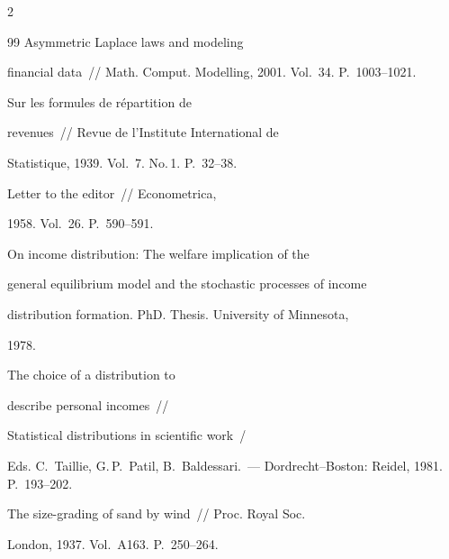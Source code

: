 \begin{multicols}{2}
{{\begin{thebibliography}{99}
Asymmetric Laplace laws and modeling


financial data~// Math. Comput. Modelling, 2001. Vol.~34. P.~1003--1021.









Sur les formules de r{\'e}partition de


revenues~// Revue de l'Institute International de


Statistique, 1939. Vol.~7. No.\,1. P.~32--38.









Letter to the editor~// Econometrica,


1958. Vol.~26. P.~590--591.









On income distribution: The welfare implication of the


general equilibrium model and the stochastic processes of income


distribution formation. PhD. Thesis. University of Minnesota,


1978.









The choice of a distribution to


describe personal incomes~//


Statistical distributions in scientific work~/


Eds. C.~Taillie, G.\,P.~Patil, B.~Baldessari.~---  Dordrecht--Boston: Reidel, 1981. P.~193--202.


 






The size-grading of sand by wind~// Proc. Royal Soc.


London, 1937. Vol.~A163. P.~250--264.






\end{thebibliography}}}
\end{multicols}
